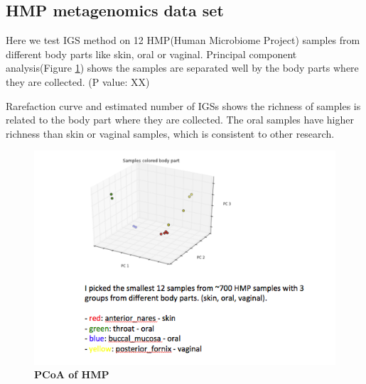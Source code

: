 \documentclass[12pt]{report}
\begin{document}


\subsection{HMP metagenomics data set}
Here we test IGS method on 12 HMP(Human Microbiome Project) samples from different body parts like skin, oral or vaginal. 
Principal component analysis(Figure \ref{fig:HMP_beta}) shows the samples are separated well by the body parts where they are collected. (P value: XX)

Rarefaction curve and estimated number of IGSs shows the richness of samples is related to the body part where they are collected. The 
oral samples have higher richness than skin or vaginal samples, which is consistent  to other research. 



\begin{figure}[!ht]
 \centerline{\includegraphics[width=7in]{./figures/HMP_beta.png}}
\caption{\bf PCoA of HMP}
\label{fig:HMP_beta}
\end{figure}
\end{document}
